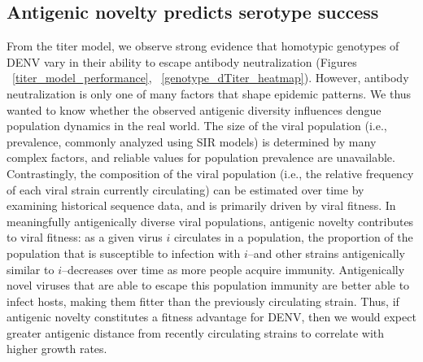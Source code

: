 \documentclass[11pt,oneside,letterpaper]{article}
\begin{document}
\subsection{Antigenic novelty predicts serotype success}
From the titer model, we observe strong evidence that homotypic genotypes of DENV vary in their ability to escape antibody neutralization (Figures ~\ref{titer_model_performance}, ~\ref{genotype_dTiter_heatmap}).
However, antibody neutralization is only one of many factors that shape epidemic patterns.
We thus wanted to know whether the observed antigenic diversity influences dengue population dynamics in the real world.
The size of the viral population (i.e., prevalence, commonly analyzed using SIR models) is determined by many complex factors, and reliable values for population prevalence are unavailable.
Contrastingly, the composition of the viral population (i.e., the relative frequency of each viral strain currently circulating) can be estimated over time by examining historical sequence data, and is primarily driven by viral fitness.
In meaningfully antigenically diverse viral populations, antigenic novelty contributes to viral fitness: as a given virus $i$ circulates in a population, the proportion of the population that is susceptible to infection with $i$--and other strains antigenically similar to $i$--decreases over time as more people acquire immunity.
Antigenically novel viruses that are able to escape this population immunity are better able to infect hosts, making them fitter than the previously circulating strain.
Thus, if antigenic novelty constitutes a fitness advantage for DENV, then we would expect greater antigenic distance from recently circulating strains to correlate with higher growth rates.
\end{document}
